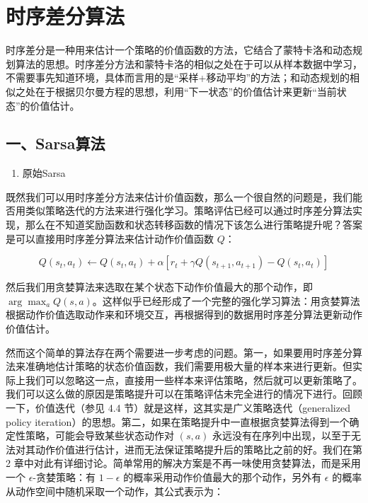 \setcounter{section}{2}

\hypertarget{ux65f6ux5e8fux5deeux5206ux7b97ux6cd5}{%
\section{时序差分算法}\label{ux65f6ux5e8fux5deeux5206ux7b97ux6cd5}}

时序差分是一种用来估计一个策略的价值函数的方法，它结合了蒙特卡洛和动态规划算法的思想。时序差分方法和蒙特卡洛的相似之处在于可以从样本数据中学习，不需要事先知道环境，具体而言用的是``采样+移动平均''的方法；和动态规划的相似之处在于根据贝尔曼方程的思想，利用``下一状态''的价值估计来更新``当前状态''的价值估计。

\hypertarget{ux4e00sarsaux7b97ux6cd5}{%
\subsection{一、Sarsa算法}\label{ux4e00sarsaux7b97ux6cd5}}

\begin{enumerate}
\def\labelenumi{\arabic{enumi}.}
\tightlist
\item
  原始Sarsa
\end{enumerate}

既然我们可以用时序差分方法来估计价值函数，那么一个很自然的问题是，我们能否用类似策略迭代的方法来进行强化学习。策略评估已经可以通过时序差分算法实现，那么在不知道奖励函数和状态转移函数的情况下该怎么进行策略提升呢？答案是可以直接用时序差分算法来估计动作价值函数 \(Q\)：

\[
Q(s_t,a_t)\leftarrow Q(s_t,a_t)+\alpha[r_t+\gamma Q(s_{t+1},a_{t+1})-Q(s_t,a_t)]
\]

然后我们用贪婪算法来选取在某个状态下动作价值最大的那个动作，即 \(\arg\max_a Q(s,a)\)。这样似乎已经形成了一个完整的强化学习算法：用贪婪算法根据动作价值选取动作来和环境交互，再根据得到的数据用时序差分算法更新动作价值估计。

然而这个简单的算法存在两个需要进一步考虑的问题。第一，如果要用时序差分算法来准确地估计策略的状态价值函数，我们需要用极大量的样本来进行更新。但实际上我们可以忽略这一点，直接用一些样本来评估策略，然后就可以更新策略了。我们可以这么做的原因是策略提升可以在策略评估未完全进行的情况下进行。回顾一下，价值迭代（参见 4.4 节）就是这样，这其实是广义策略迭代（generalized policy iteration）的思想。第二，如果在策略提升中一直根据贪婪算法得到一个确定性策略，可能会导致某些状态动作对 \((s,a)\) 永远没有在序列中出现，以至于无法对其动作价值进行估计，进而无法保证策略提升后的策略比之前的好。我们在第 2 章中对此有详细讨论。简单常用的解决方案是不再一味使用贪婪算法，而是采用一个 \(\epsilon\)-贪婪策略：有 \(1-\epsilon\) 的概率采用动作价值最大的那个动作，另外有 \(\epsilon\) 的概率从动作空间中随机采取一个动作，其公式表示为：

